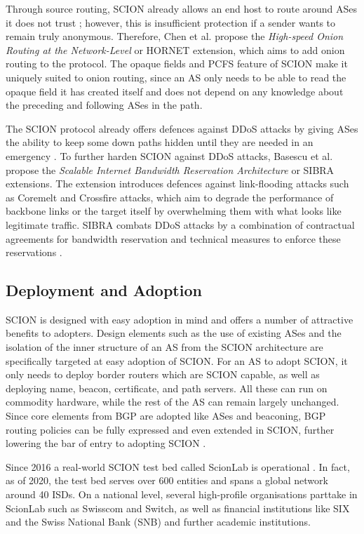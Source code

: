 \documentclass[../eva1_scion.tex]{subfiles}
\begin{document}
    Through source routing, SCION already allows an end host to route around ASes it does not trust \cite{scion_2011}; however, this is insufficient protection if a sender wants to remain truly anonymous. Therefore, Chen et al. propose the \textit{High-speed Onion Routing at the Network-Level} \cite{hornet_2015, hornet_2016} or HORNET extension, which aims to add onion routing \cite{onion_routing} to the protocol. The opaque fields and PCFS feature of SCION make it uniquely suited to onion routing, since an AS only needs to be able to read the opaque field it has created itself and does not depend on any knowledge about the preceding and following ASes in the path.

    The SCION protocol already offers defences against DDoS attacks by giving ASes the ability to keep some down paths hidden until they are needed in an emergency \cite{scion_2015}. To further harden SCION against DDoS attacks, Basescu et al. propose the \textit{Scalable Internet Bandwidth Reservation Architecture} \cite{sibra_2016} or SIBRA extensions. The extension introduces defences against link-flooding attacks such as Coremelt \cite{coremelt} and Crossfire \cite{crossfire} attacks, which aim to degrade the performance of backbone links or the target itself by overwhelming them with what looks like legitimate traffic. SIBRA combats DDoS attacks by a combination of contractual agreements for bandwidth reservation and technical measures to enforce these reservations \cite{sibra_2016}.

    \subsection{Deployment and Adoption}%
    \label{ssec:deployment_and_adoption}
    SCION is designed with easy adoption in mind and offers a number of attractive benefits to adopters. Design elements such as the use of existing ASes and the isolation of the inner structure of an AS from the SCION architecture are specifically targeted at easy adoption of SCION. For an AS to adopt SCION, it only needs to deploy border routers which are SCION capable, as well as deploying name, beacon, certificate, and path servers. All these can run on commodity hardware, while the rest of the AS can remain largely unchanged. Since core elements from BGP are adopted like ASes and beaconing, BGP routing policies can be fully expressed and even extended in SCION, further lowering the bar of entry to adopting SCION \cite{scion_2017}.

    Since 2016 a real-world SCION test bed called ScionLab is operational \cite{testbed_2020}. In fact, as of 2020, the test bed serves over 600 entities and spans a global network around 40 ISDs. On a national level, several high-profile organisations parttake in ScionLab such as Swisscom and Switch, as well as financial institutions like SIX and the Swiss National Bank (SNB) \cite{snb} and further academic institutions.
\end{document}
